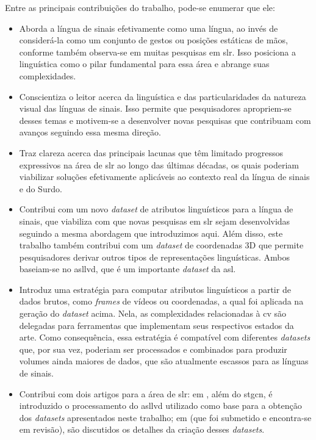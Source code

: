 
Entre as principais contribuições do trabalho, pode-se enumerar que ele:

\begin{itemize}
      \item Aborda a língua de sinais efetivamente como uma língua, ao invés de considerá-la como um conjunto de gestos ou posições estáticas de mãos, conforme também observa-se em muitas pesquisas em \acrshort{slr}.
            Isso posiciona a linguística como o pilar fundamental para essa área e abrange suas complexidades.
 
      \item Conscientiza o leitor acerca da linguística e das particularidades da natureza visual das línguas de sinais.
            Isso permite que pesquisadores apropriem-se desses temas e motivem-se a desenvolver novas pesquisas que contribuam com avanços seguindo essa mesma direção.

      \item Traz clareza acerca das principais lacunas que têm limitado progressos expressivos na área de \acrshort{slr} ao longo das últimas décadas, os quais poderiam viabilizar soluções efetivamente aplicáveis ao contexto real da língua de sinais e do Surdo.

      \item Contribui com um novo \textit{dataset} de atributos linguísticos para a língua de sinais, que viabiliza com que novas pesquisas em \acrshort{slr} sejam desenvolvidas seguindo a mesma abordagem que introduzimos aqui.
            Além disso, este trabalho também contribui com um \textit{dataset} de coordenadas 3D que permite pesquisadores derivar outros tipos de representações linguísticas.
            Ambos baseiam-se no \acrshort{asllvd}, que é um importante \textit{dataset} da \acrshort{asl}.

      \item Introduz uma estratégia para computar atributos linguísticos a partir de dados brutos, como \textit{frames} de vídeos ou coordenadas, a qual foi aplicada na geração do \textit{dataset} acima.
            Nela, as complexidades relacionadas à \acrlong{cv} são delegadas para ferramentas que implementam seus respectivos estados da arte.
            Como consequência, essa estratégia é compatível com diferentes \textit{datasets} que, por sua vez, poderiam ser processados e combinados para produzir volumes ainda maiores de dados, que são atualmente escassos para as línguas de sinais.
 
      \item Contribui com dois artigos para a área de \acrshort{slr}:
            em , além do \acrshort{stgcn}, é introduzido o processamento do \acrshort{asllvd} utilizado como base para a obtenção dos \textit{datasets} apresentados neste trabalho;
            em  (que foi submetido e encontra-se em revisão), são discutidos os detalhes da criação desses \textit{datasets}.

\end{itemize}

